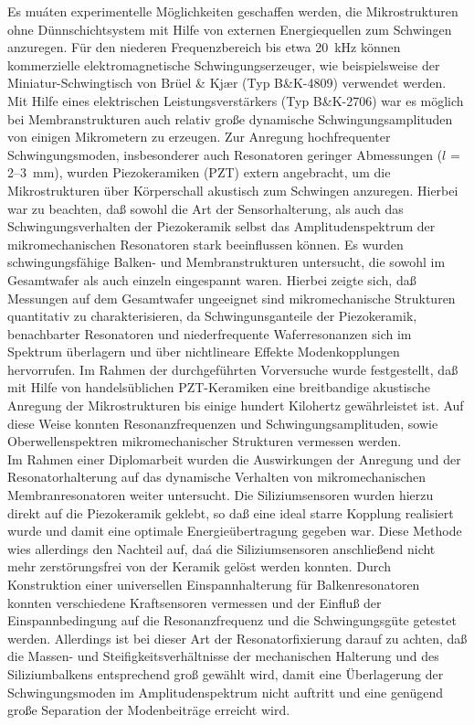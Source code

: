 Es muáten experimentelle Möglichkeiten geschaffen werden, die
Mikrostrukturen ohne Dünnschichtsystem mit Hilfe von externen
Energiequellen zum Schwingen anzuregen. Für den niederen Frequenzbereich
bis etwa 20~kHz können kommerzielle elektromagnetische Schwingungserzeuger,
wie beispielsweise der Miniatur-Schwingtisch von Brüel \& Kj\ae r
(Typ B\&K-4809) verwendet werden. Mit Hilfe eines elektrischen
Leistungsverstärkers (Typ B\&K-2706) war es möglich bei
Membranstrukturen auch relativ große dynamische Schwingungsamplituden
von einigen Mikrometern zu erzeugen. Zur Anregung hochfrequenter
Schwingungsmoden, insbesonderer auch Resonatoren geringer Abmessungen
($l$ = 2--3~mm), wurden Piezokeramiken (PZT) extern angebracht, um die
Mikrostrukturen über
Körperschall akustisch zum Schwingen anzuregen. Hierbei war zu beachten,
daß sowohl die Art der Sensorhalterung, als auch das Schwingungsverhalten
der Piezokeramik selbst das Amplitudenspektrum der mikromechanischen
Resonatoren stark beeinflussen können. Es wurden  schwingungsfähige Balken-
und Membranstrukturen untersucht, die sowohl im Gesamtwafer als auch einzeln
eingespannt waren. Hierbei zeigte sich, daß Messungen
auf dem Gesamtwafer ungeeignet sind mikromechanische Strukturen quantitativ
zu charakterisieren, da Schwingunsganteile der Piezokeramik, benachbarter
Resonatoren und niederfrequente Waferresonanzen sich im Spektrum überlagern
und über nichtlineare Effekte Modenkopplungen hervorrufen. Im Rahmen der
durchgeführten Vorversuche wurde festgestellt, daß mit Hilfe von
handelsüblichen PZT-Keramiken eine breitbandige akustische Anregung der
Mikrostrukturen bis einige hundert Kilohertz gewährleistet ist. Auf diese
Weise konnten Resonanzfrequenzen und Schwingungsamplituden, sowie
Oberwellenspektren mikromechanischer Strukturen vermessen werden.\\
%
Im Rahmen einer Diplomarbeit \cite{Bra92a} wurden die Auswirkungen der
Anregung und der Resonatorhalterung auf das dynamische Verhalten
von mikromechanischen Membranresonatoren weiter untersucht.
Die Siliziumsensoren wurden hierzu direkt auf die Piezokeramik geklebt,
so daß eine ideal starre Kopplung realisiert wurde und damit eine optimale
Energieüber\-tragung gegeben war. Diese Methode wies allerdings den
Nachteil auf, daá die Siliziumsensoren
anschließend nicht mehr zerstörungsfrei von der Keramik gelöst werden
konnten. Durch Konstruktion einer universellen Einspannhalterung für
Balkenresonatoren \cite{Bra92b} konnten verschiedene Kraftsensoren
vermessen und der Einfluß der Einspannbedingung auf die Resonanzfrequenz
und die Schwingungsgüte getestet werden. Allerdings ist bei dieser Art der
Resonatorfixierung darauf zu achten, daß die Massen- und
Steifigkeitsverhältnisse der mechanischen Halterung und des
Siliziumbalkens entsprechend groß gewählt wird, damit eine Überlagerung
der Schwingungsmoden im Amplitudenspektrum nicht auftritt und eine genügend
große Separation der Modenbeiträge erreicht wird.\\


